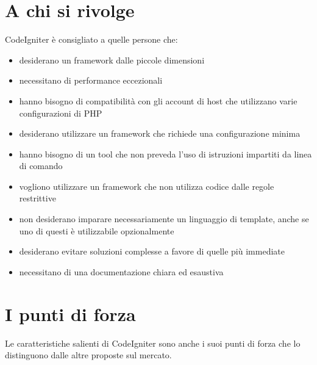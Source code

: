 \section*{A chi si rivolge}
CodeIgniter è consigliato a quelle persone che:

\begin{itemize}
\item desiderano un framework dalle piccole dimensioni
\item necessitano di performance eccezionali
\item hanno bisogno di compatibilità con gli account di host che utilizzano varie configurazioni di \ac{PHP}
\item desiderano utilizzare un framework che richiede una configurazione minima
\item hanno bisogno di un tool che non preveda l'uso di istruzioni impartiti da linea di comando
\item vogliono utilizzare un framework che non utilizza codice dalle regole restrittive
\item non desiderano imparare necessariamente un linguaggio di template, anche se uno di questi è utilizzabile opzionalmente
\item desiderano evitare soluzioni complesse a favore di quelle più immediate
\item necessitano di una documentazione chiara ed esaustiva
\end{itemize}

\section*{I punti di forza}
Le caratteristiche salienti di CodeIgniter sono anche i suoi punti di forza che lo distinguono dalle altre proposte sul mercato.

